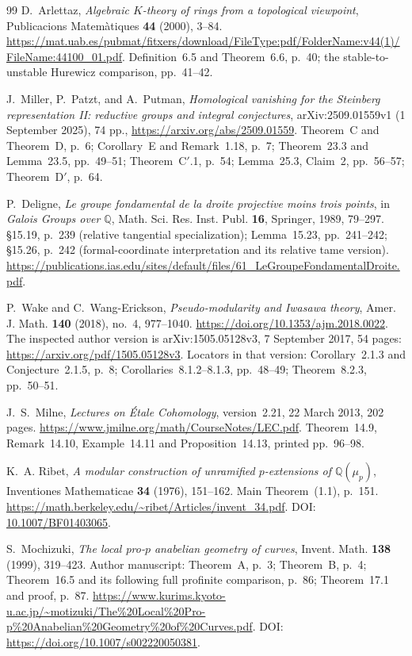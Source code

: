 \documentclass[11pt,a4paper]{article}
\theoremstyle{definition}
\begin{document}
\begin{thebibliography}{99}
D.~Arlettaz,
\emph{Algebraic $K$-theory of rings from a topological viewpoint},
Publicacions Matem\`atiques \textbf{44} (2000), 3--84.
\url{https://mat.uab.es/pubmat/fitxers/download/FileType:pdf/FolderName:v44(1)/FileName:44100_01.pdf}.
Definition~6.5 and Theorem~6.6, p.~40;
the stable-to-unstable Hurewicz comparison, pp.~41--42.

J.~Miller, P.~Patzt, and A.~Putman,
\emph{Homological vanishing for the Steinberg representation II:
reductive groups and integral conjectures},
arXiv:2509.01559v1 (1 September 2025), 74 pp.,
\url{https://arxiv.org/abs/2509.01559}.
Theorem~C and Theorem~D, p.~6; Corollary~E and Remark~1.18,
p.~7; Theorem~23.3 and Lemma~23.5, pp.~49--51;
Theorem~C$'$.1, p.~54; Lemma~25.3, Claim~2, pp.~56--57;
Theorem~D$'$, p.~64.

P.~Deligne, \emph{Le groupe fondamental de la droite projective
moins trois points}, in \emph{Galois Groups over $\mathbb Q$},
Math. Sci. Res. Inst. Publ. \textbf{16}, Springer, 1989, 79--297.
\S15.19, p.~239 (relative tangential specialization);
Lemma~15.23, pp.~241--242; \S15.26, p.~242
(formal-coordinate interpretation and its relative tame version).
\url{https://publications.ias.edu/sites/default/files/61_LeGroupeFondamentalDroite.pdf}.

P.~Wake and C.~Wang-Erickson,
\emph{Pseudo-modularity and Iwasawa theory},
Amer. J. Math. \textbf{140} (2018), no.~4, 977--1040.
\url{https://doi.org/10.1353/ajm.2018.0022}.
The inspected author version is arXiv:1505.05128v3,
7 September 2017, 54 pages:
\url{https://arxiv.org/pdf/1505.05128v3}.
Locators in that version: Corollary~2.1.3 and Conjecture~2.1.5, p.~8;
Corollaries~8.1.2--8.1.3, pp.~48--49;
Theorem~8.2.3, pp.~50--51.


J.~S.~Milne,
\emph{Lectures on \textup{\'Etale} Cohomology},
version~2.21, 22 March 2013, 202 pages.
\url{https://www.jmilne.org/math/CourseNotes/LEC.pdf}.
Theorem~14.9, Remark~14.10, Example~14.11 and Proposition~14.13,
printed pp.~96--98.

K.~A. Ribet,
\emph{A modular construction of unramified $p$-extensions of
$\mathbb Q(\mu_p)$},
Inventiones Mathematicae \textbf{34} (1976), 151--162.
Main Theorem~(1.1), p.~151.
\url{https://math.berkeley.edu/~ribet/Articles/invent_34.pdf}.
DOI: \href{https://doi.org/10.1007/BF01403065}{10.1007/BF01403065}.

S.~Mochizuki, \emph{The local pro-$p$ anabelian geometry of curves},
Invent. Math. \textbf{138} (1999), 319--423.
Author manuscript: Theorem~A, p.~3; Theorem~B, p.~4;
Theorem~16.5 and its following full profinite comparison, p.~86;
Theorem~17.1 and proof, p.~87.
\url{https://www.kurims.kyoto-u.ac.jp/~motizuki/The%20Local%20Pro-p%20Anabelian%20Geometry%20of%20Curves.pdf}.
DOI: \url{https://doi.org/10.1007/s002220050381}.


\end{thebibliography}
\end{document}
